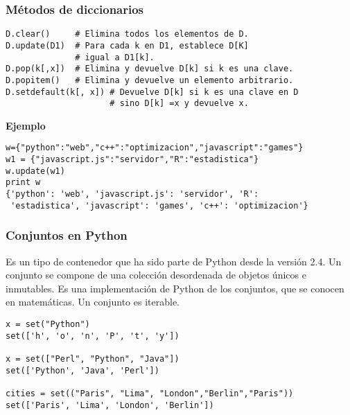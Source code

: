 \documentclass[10pt]{beamer}
\begin{document}
\begin{frame}[fragile]
\frametitle{M\'etodos de diccionarios}

\vspace{0.2cm}

\begin{lstlisting}
D.clear()     # Elimina todos los elementos de D.
D.update(D1)  # Para cada k en D1, establece D[K]
              # igual a D1[k].
D.pop(k[,x])  # Elimina y devuelve D[k] si k es una clave.
D.popitem()   # Elimina y devuelve un elemento arbitrario.
D.setdefault(k[, x]) # Devuelve D[k] si k es una clave en D
                     # sino D[k] =x y devuelve x.

\end{lstlisting}

\vspace{0.2cm}

\textbf{Ejemplo}

\vspace{0.2cm}

\begin{lstlisting}
w={"python":"web","c++":"optimizacion","javascript":"games"}
w1 = {"javascript.js":"servidor","R":"estadistica"}
w.update(w1)
print w
{'python': 'web', 'javascript.js': 'servidor', 'R':
 'estadistica', 'javascript': 'games', 'c++': 'optimizacion'}

\end{lstlisting}

\end{frame}


\begin{frame}[fragile]
\frametitle{Conjuntos en Python}

Es un tipo de contenedor que ha sido parte de Python desde la versi\'on 2.4. Un conjunto  se compone de una colección desordenada de objetos \'unicos e inmutables. Es una implementaci\'on de Python de los conjuntos, que se conocen en matem\'aticas. Un conjunto es iterable.


\vspace{0.2cm}

\begin{lstlisting}
x = set("Python")
set(['h', 'o', 'n', 'P', 't', 'y'])

x = set(["Perl", "Python", "Java"])
set(['Python', 'Java', 'Perl'])

cities = set(("Paris", "Lima", "London","Berlin","Paris"))
set(['Paris', 'Lima', 'London', 'Berlin'])
\end{lstlisting}

\end{frame}
\end{document}
